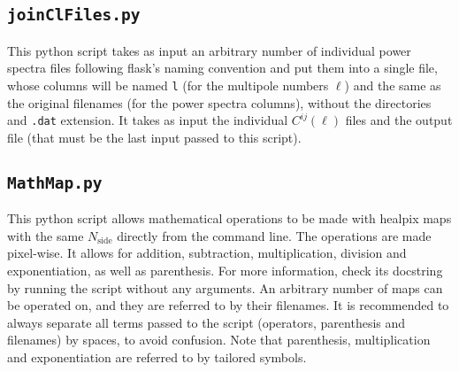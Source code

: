 \documentclass[12pt]{book} %
\begin{document}
\subsection{{\tt joinClFiles.py}}
\label{sec:joinClFiles}

This {\sc python} script takes as input an arbitrary number of individual 
power spectra files following {\sc flask}'s naming convention and put them 
into a single file, whose columns will be named {\tt l} (for the multipole numbers 
$\ell$) and the same as the original filenames (for the power spectra columns), 
without the directories and {\tt .dat} extension. It takes as input the individual 
$C^{ij}(\ell)$ files and the output file (that must be the last input passed to this script).

\subsection{{\tt MathMap.py}}
\label{sec:MathMap}

This {\sc python} script allows mathematical operations to be made with {\sc healpix} 
maps with the same $N_{\mathrm{side}}$ directly from the command line. The operations are 
made pixel-wise. It allows for addition, subtraction, multiplication, division and 
exponentiation, as well as parenthesis. For more information, check its docstring by 
running the script without any arguments. An arbitrary number of maps can be operated on, 
and they are referred to by their filenames. It is recommended to always separate all 
terms passed to the script (operators, parenthesis and filenames) by spaces, to avoid 
confusion. Note that parenthesis, multiplication and exponentiation are referred to 
by tailored symbols.




\end{document}
